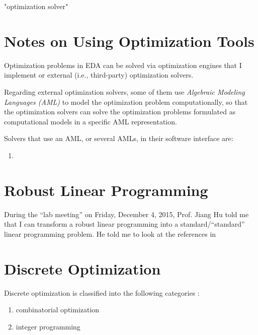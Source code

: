 "optimization solver"


\section{Notes on Using Optimization Tools}
\label{sec:NotesonUsingOptimizationTools}


Optimization problems in EDA can be solved via optimization engines that I implement or external (i.e., third-party) optimization solvers.

Regarding external optimization solvers, some of them use {\it Algebraic Modeling Languages (AML)} \cite{WikipediaContributors2015i} to model the optimization problem computationally, so that the optimization solvers can solve the optimization problems formulated as computational models in a specific AML representation.

Solvers that use an AML, or several AMLs, in their software interface are: \vspace{-0.3cm}
\begin{enumerate} \itemsep -4pt
\item 
\end{enumerate}



\section{Robust Linear Programming}
\label{sec:RobustLinearProgramming}


During the ``lab meeting'' on Friday, December 4, 2015, Prof. Jiang Hu told me that I can transform a robust linear programming into a standard/``standard'' linear programming problem. He told me to look at the references in 




\section{Discrete Optimization}
\label{sec:DiscreteOptimization}

Discrete optimization is classified into the following categories \cite{WikipediaContributors2015h,Hammer1979,Lee2004c}: \vspace{-0.3cm}
\begin{enumerate} \itemsep -4pt
\item combinatorial optimization
\item integer programming
\end{enumerate}








